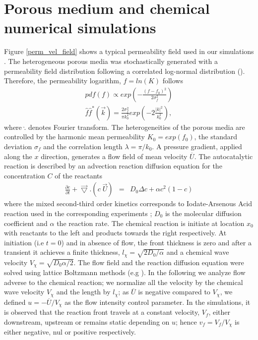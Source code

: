 \documentclass[doublecol]{epl2}
\begin{document}
\section{Porous medium and chemical numerical simulations}
Figure \ref{perm_vel_field} shows a typical permeability field used in our simulations \cite{talon03}.
 The heterogeneous porous media was stochastically generated with a permeability field distribution following a correlated log-normal distribution (\cite{gelhar83}). Therefore, the permeability logarithm, $f=ln(K)$ follows
\begin{eqnarray}
pdf(f)\propto exp(-\frac{(f-f_0)^2}{2\sigma_f^2}) \\
\hat f \hat f^*(\vec k) = \frac{2 \sigma_f^2}{\pi k_0^2}  exp(-2 \frac{|k|^2}{k^2_0}),
\end{eqnarray}
where $\hat .$ denotes Fourier transform.
The heterogeneities of the porous media are controlled by the harmonic mean permeability $K_0 = exp(f_0)$, the standard deviation $\sigma_f$ and the correlation length  $\lambda = \pi / k_0$.
 A pressure gradient, applied along the $x$ direction, generates a flow field of mean velocity $\overline{U}$.
The autocatalytic reaction is described by an advection reaction diffusion equation for the concentration $C$ of the reactants
\begin{eqnarray}
  \frac{\partial c}{\partial t} + \vec{\bigtriangledown}.(c \; \vec{U}) & = & D_0 \Delta c + \alpha c^2(1 - c)
\label{pt_trans}
\end{eqnarray}
where the mixed second-third order kinetics corresponds to Iodate-Arsenous Acid reaction used in the corresponding experiments \cite{scott94,leconte03,atis12b}; $D_0$ is the molecular diffusion coefficient and $\alpha$ the reaction rate.  The chemical reaction is initiate at
location $x_0$ with reactants to the left and products towards the right respectively. At initiation (i.e $t = 0$)  and in absence of flow, the front thickness is zero and after a transient it achieves a
finite thickness, $l_\chi=\sqrt{2 D_0 / \alpha}$ and a chemical wave velocity $V_\chi = \sqrt{D_0 \alpha /2}$.
The flow field and the reaction diffusion equation were solved using lattice Boltzmann methods (e.g \cite{talon03,talon04b,jarrige10a}).
In the following we analyze flow adverse to the chemical reaction; we normalize all the velocity by the chemical wave velocity $V_{\chi}$ and the length by $l_{\chi}$; as $\overline{U}$ is negative compared to $V_{\chi}$, we defined $u=-\overline{U}/V_{\chi}$ as the flow intensity control parameter.
In the simulations, it is observed that the reaction front travels at a constant velocity, $V_f$, either downstream, upstream or remains static depending on $u$; hence $v_f=V_f/V_{\chi}$ is either negative, nul or positive respectively.
\end{document}
